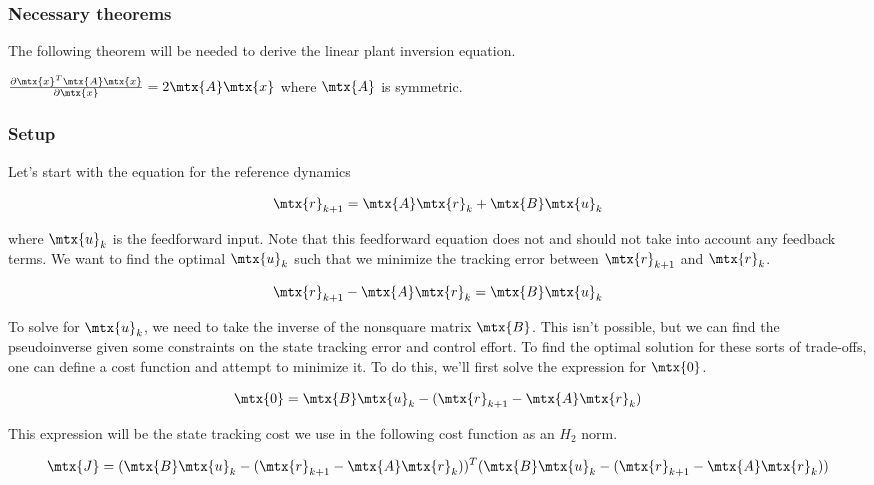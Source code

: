 \subsubsection{Necessary theorems}

The following theorem will be needed to derive the linear plant inversion
equation.

\begin{theorem}
  \label{thm:partial_xax}

  $\frac{\partial \mtx{x}^T\mtx{A}\mtx{x}}{\partial\mtx{x}} =
    2\mtx{A}\mtx{x}$ where $\mtx{A}$ is symmetric.
\end{theorem}

\subsubsection{Setup}

Let's start with the equation for the \gls{reference} dynamics

\begin{equation*}
  \mtx{r}_{k+1} = \mtx{A}\mtx{r}_k + \mtx{B}\mtx{u}_k
\end{equation*}

where $\mtx{u}_k$ is the feedforward input. Note that this feedforward equation
does not and should not take into account any feedback terms. We want to find
the optimal $\mtx{u}_k$ such that we minimize the \gls{tracking} error between
$\mtx{r}_{k+1}$ and $\mtx{r}_k$.

\begin{equation*}
  \mtx{r}_{k+1} - \mtx{A}\mtx{r}_k = \mtx{B}\mtx{u}_k
\end{equation*}

To solve for $\mtx{u}_k$, we need to take the inverse of the nonsquare matrix
$\mtx{B}$. This isn't possible, but we can find the pseudoinverse given some
constraints on the \gls{state} \gls{tracking} error and \gls{control effort}. To
find the optimal solution for these sorts of trade-offs, one can define a cost
function and attempt to minimize it. To do this, we'll first solve the
expression for $\mtx{0}$.

\begin{equation*}
  \mtx{0} = \mtx{B}\mtx{u}_k - (\mtx{r}_{k+1} - \mtx{A}\mtx{r}_k)
\end{equation*}

This expression will be the \gls{state} \gls{tracking} cost we use in the
following cost function as an $H_2$ norm.

\begin{equation*}
  \mtx{J} = (\mtx{B}\mtx{u}_k - (\mtx{r}_{k+1} - \mtx{A}\mtx{r}_k))^T
    (\mtx{B}\mtx{u}_k - (\mtx{r}_{k+1} - \mtx{A}\mtx{r}_k))
\end{equation*}

